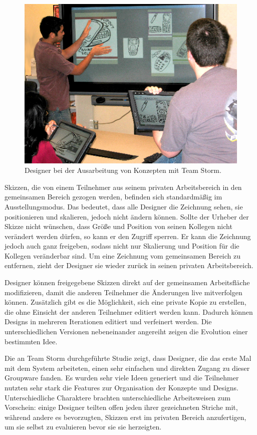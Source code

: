 \begin{figure}[bth]
	\includegraphics[width=\linewidth]{gfx/teamStormDisplayInteraction.png}
	\caption{Designer bei der Ausarbeitung von Konzepten mit Team Storm.}
	\label{fig:teamStormDisplayInteraction}
\end{figure}

Skizzen, die von einem Teilnehmer aus seinem privaten Arbeitsbereich in den gemeinsamen Bereich gezogen werden, befinden sich standardmäßig im Ausstellungsmodus. Das bedeutet, dass alle Designer die Zeichnung sehen, sie positionieren und skalieren, jedoch nicht ändern können. Sollte der Urheber der Skizze nicht wünschen, dass Größe und Position von seinen Kollegen nicht verändert werden dürfen, so kann er den Zugriff sperren. Er kann die Zeichnung jedoch auch ganz freigeben, sodass nicht nur Skalierung und Position für die Kollegen veränderbar sind. Um eine Zeichnung vom gemeinsamen Bereich zu entfernen, zieht der Designer sie wieder zurück in seinen privaten Arbeitsbereich.

Designer können freigegebene Skizzen direkt auf der gemeinsamen Arbeitsfläche modifizieren, damit die anderen Teilnehmer die Änderungen live mitverfolgen können. Zusätzlich gibt es die Möglichkeit, sich eine private Kopie zu erstellen, die ohne Einsicht der anderen Teilnehmer editiert werden kann. Dadurch können Designs in mehreren Iterationen editiert und verfeinert werden. Die unterschiedlichen Versionen nebeneinander angereiht zeigen die Evolution einer bestimmten Idee.

Die an Team Storm durchgeführte Studie \citep{Hailpern:2007p113} zeigt, dass Designer, die das erste Mal mit dem System arbeiteten, einen sehr einfachen und direkten Zugang zu dieser Groupware fanden. Es wurden sehr viele Ideen generiert und die Teilnehmer nutzten sehr stark die Features zur Organisation der Konzepte und Designs. Unterschiedliche Charaktere brachten unterschiedliche Arbeitsweisen zum Vorschein: einige Designer teilten offen jeden ihrer gezeichneten Striche mit, während andere es bevorzugten, Skizzen erst im privaten Bereich anzufertigen, um sie selbst zu evaluieren bevor sie sie herzeigten.

